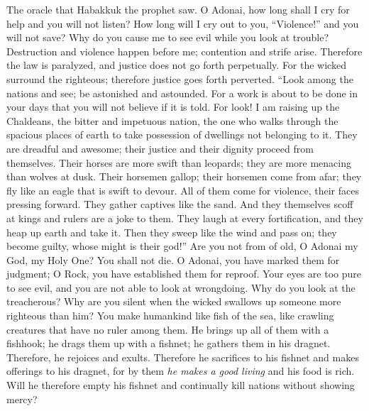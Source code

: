 
\begin{biblechapter} %
 The oracle that Habakkuk the prophet saw.
\verse O Adonai, how long shall I cry for help 
and you will not listen? 
How long will I cry out to you, “Violence!” 
and you will not save?
\verse Why do you cause me to see evil 
while you look at trouble? 
Destruction and violence happen before me; 
contention and strife arise.
\verse Therefore the law is paralyzed, 
and justice does not go forth perpetually. 
For the wicked surround the righteous; 
therefore justice goes forth perverted.
 “Look among the nations and see; 
be astonished and astounded. 
For a work is about to be done in your days 
that you will not believe if it is told.
\verse For look! I am raising up the Chaldeans, 
the bitter and impetuous nation, 
the one who walks through the spacious places of earth 
to take possession of dwellings not belonging to it.
\verse They are dreadful and awesome; 
their justice and their dignity proceed from themselves.
\verse Their horses are more swift than leopards; 
they are more menacing than wolves at dusk. 
Their horsemen gallop; their horsemen come from afar; 
they fly like an eagle that is swift to devour.
\verse All of them come for violence, 
their faces pressing forward. 
They gather captives like the sand.
\verse And they themselves scoff at kings 
and rulers are a joke to them. 
They laugh at every fortification, 
and they heap up earth and take it.
\verse Then they sweep like the wind and pass on; 
they become guilty, whose might is their god!”
 Are you not from of old, 
O Adonai my God, my Holy One? 
You shall not die. 
O Adonai, you have marked them for judgment; 
O Rock, you have established them for reproof.
\verse Your eyes are too pure to see evil, 
and you are not able to look at wrongdoing. 
Why do you look at the treacherous? 
Why are you silent when the wicked swallows up 
someone more righteous than him?
\verse You make humankind like fish of the sea, 
like crawling creatures that have no ruler among them.
\verse He brings up all of them with a fishhook; 
he drags them up with a fishnet; 
he gathers them in his dragnet. 
Therefore, he rejoices and exults.
\verse Therefore he sacrifices to his fishnet 
and makes offerings to his dragnet, 
for by them \textit{he makes a good living} 
and his food is rich.
\verse Will he therefore empty his fishnet 
and continually kill nations without showing mercy?
\end{biblechapter}

